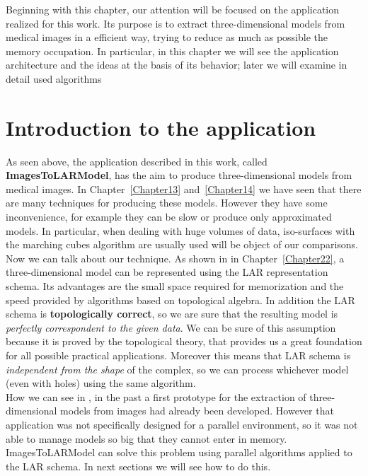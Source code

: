 Beginning with this chapter, our attention will be focused on the application realized for this work. Its purpose is to extract three-dimensional models from medical images in a efficient way, trying to reduce as much as possible the memory occupation. In particular, in this chapter we will see the application architecture and the ideas at the basis of its behavior; later we will examine in detail used algorithms 

\section{Introduction to the application}\label{sec31:introduction}

As seen above, the application described in this work, called \textbf{ImagesToLARModel}, has the aim to produce three-dimensional models from medical images. In Chapter~\ref{Chapter13} and~\ref{Chapter14} we have seen that there are many techniques for producing these models. However they have some inconvenience, for example they can be slow or produce only approximated models. In particular, when dealing with huge volumes of data, iso-surfaces with the marching cubes algorithm are usually used will be object of our comparisons.\\

Now we can talk about our technique. As shown in in Chapter~\ref{Chapter22}, a three-dimensional model can be represented using the LAR representation schema. Its advantages are the small space required for memorization and the speed provided by algorithms based on topological algebra. In addition the LAR schema is \textbf{topologically correct}, so we are sure that the resulting model is \textit{perfectly correspondent to the given data}. We can be sure of this assumption because it is proved by the topological theory, that provides us a great foundation for all possible practical applications. Moreover this means that LAR schema is \textit{independent from the shape} of the complex, so we can process whichever model (even with holes) using the same algorithm.\\

How we can see in \cite{Paoluzzi}, in the past a first prototype for the extraction of three-dimensional models from images had already been developed. However that application was not specifically designed for a parallel environment, so it was not able to manage models so big that they cannot enter in memory. ImagesToLARModel can solve this problem using parallel algorithms applied to the LAR schema. In next sections we will see how to do this.

